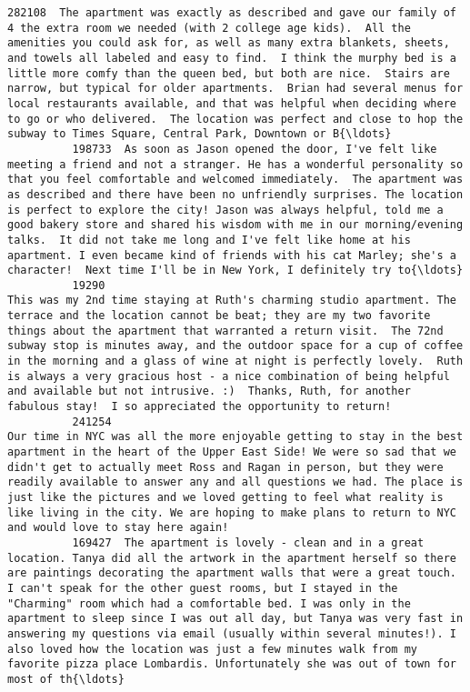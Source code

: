 \documentclass[11pt]{article}
\begin{document}
\begin{Verbatim}[commandchars=\\\{\}]
          282108  The apartment was exactly as described and gave our family of 4 the extra room we needed (with 2 college age kids).  All the amenities you could ask for, as well as many extra blankets, sheets, and towels all labeled and easy to find.  I think the murphy bed is a little more comfy than the queen bed, but both are nice.  Stairs are narrow, but typical for older apartments.  Brian had several menus for local restaurants available, and that was helpful when deciding where to go or who delivered.  The location was perfect and close to hop the subway to Times Square, Central Park, Downtown or B{\ldots}   
          198733  As soon as Jason opened the door, I've felt like meeting a friend and not a stranger. He has a wonderful personality so that you feel comfortable and welcomed immediately.  The apartment was as described and there have been no unfriendly surprises. The location is perfect to explore the city! Jason was always helpful, told me a good bakery store and shared his wisdom with me in our morning/evening talks.  It did not take me long and I've felt like home at his apartment. I even became kind of friends with his cat Marley; she's a character!  Next time I'll be in New York, I definitely try to{\ldots}   
          19290                                                                 This was my 2nd time staying at Ruth's charming studio apartment. The terrace and the location cannot be beat; they are my two favorite things about the apartment that warranted a return visit.  The 72nd subway stop is minutes away, and the outdoor space for a cup of coffee in the morning and a glass of wine at night is perfectly lovely.  Ruth is always a very gracious host - a nice combination of being helpful and available but not intrusive. :)  Thanks, Ruth, for another fabulous stay!  I so appreciated the opportunity to return!   
          241254                                                                                                                                                     Our time in NYC was all the more enjoyable getting to stay in the best apartment in the heart of the Upper East Side! We were so sad that we didn't get to actually meet Ross and Ragan in person, but they were readily available to answer any and all questions we had. The place is just like the pictures and we loved getting to feel what reality is like living in the city. We are hoping to make plans to return to NYC and would love to stay here again!   
          169427  The apartment is lovely - clean and in a great location. Tanya did all the artwork in the apartment herself so there are paintings decorating the apartment walls that were a great touch. I can't speak for the other guest rooms, but I stayed in the "Charming" room which had a comfortable bed. I was only in the apartment to sleep since I was out all day, but Tanya was very fast in answering my questions via email (usually within several minutes!). I also loved how the location was just a few minutes walk from my favorite pizza place Lombardis. Unfortunately she was out of town for most of th{\ldots}   

\end{Verbatim}
\end{document}
